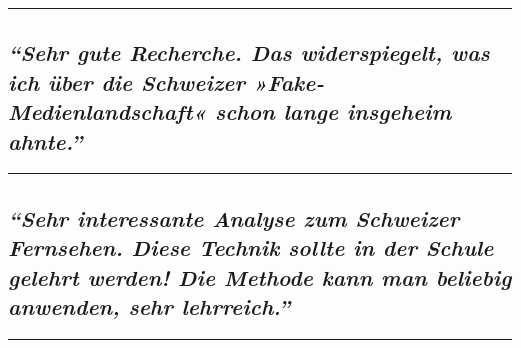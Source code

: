\begin{center}\rule{0.5\linewidth}{\linethickness}\end{center}

\hypertarget{sehr-gute-recherche-das-widerspiegelt-was-ich-uxfcber-die-schweizer-fake-medienlandschaft-schon-lange-insgeheim-ahnte}{%
\subsection{\texorpdfstring{\emph{``Sehr gute Recherche. Das
widerspiegelt, was ich über die Schweizer »Fake-Medienlandschaft« schon
lange insgeheim
ahnte.''}}{``Sehr gute Recherche. Das widerspiegelt, was ich über die Schweizer »Fake-Medienlandschaft« schon lange insgeheim ahnte.''}}\label{sehr-gute-recherche-das-widerspiegelt-was-ich-uxfcber-die-schweizer-fake-medienlandschaft-schon-lange-insgeheim-ahnte}}

\begin{center}\rule{0.5\linewidth}{\linethickness}\end{center}

\hypertarget{sehr-interessante-analyse-zum-schweizer-fernsehen-diese-technik-sollte-in-der-schule-gelehrt-werden-die-methode-kann-man-beliebig-anwenden-sehr-lehrreich}{%
\subsection{\texorpdfstring{\emph{``Sehr interessante Analyse zum
Schweizer Fernsehen. Diese Technik sollte in der Schule gelehrt werden!
Die Methode kann man beliebig anwenden, sehr
lehrreich.''}}{``Sehr interessante Analyse zum Schweizer Fernsehen. Diese Technik sollte in der Schule gelehrt werden! Die Methode kann man beliebig anwenden, sehr lehrreich.''}}\label{sehr-interessante-analyse-zum-schweizer-fernsehen-diese-technik-sollte-in-der-schule-gelehrt-werden-die-methode-kann-man-beliebig-anwenden-sehr-lehrreich}}

\begin{center}\rule{0.5\linewidth}{\linethickness}\end{center}

